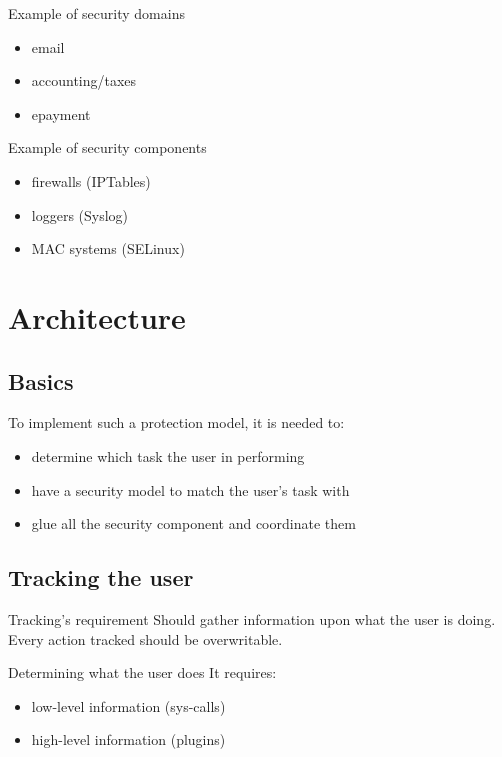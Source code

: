 \documentclass{beamer}
\begin{document}
		\begin{frame}
			\begin{block}{Example of security domains}
				\begin{itemize}
					\item email
					\item accounting/taxes
					\item epayment
				\end{itemize}
			\end{block}

			\begin{block}{Example of security components}
				\begin{itemize}
					\item firewalls (IPTables)
					\item loggers (Syslog)
					\item MAC systems (SELinux)
				\end{itemize}
			\end{block}
		\end{frame}

	\section{Architecture}
		\subsection*{Basics}
			\begin{frame}
				\begin{block}{}
					To implement such a protection model, it is needed to:
					\begin{itemize}
						\item determine which task the user in performing
						\item have a security model to match the user's task with
						\item glue all the security component and coordinate them
					\end{itemize}
				\end{block}
			\end{frame}

		\subsection*{Tracking the user}
			\begin{frame}
				\begin{block}{Tracking's requirement}
					Should gather information upon what the user is doing.\\
					Every action tracked should be overwritable.
				\end{block}

				\begin{block}{Determining what the user does}
					It requires:
					\begin{itemize}
						\item low-level information (sys-calls)
						\item high-level information (plugins)
					\end{itemize}
				\end{block}
			\end{frame}
\end{document}
